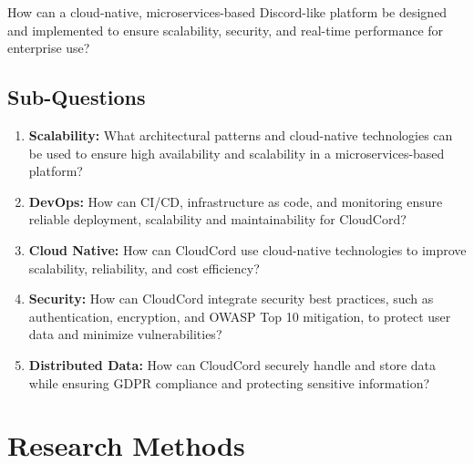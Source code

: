 \documentclass[12pt]{report}
\begin{document}
How can a cloud-native, microservices-based Discord-like platform be designed and implemented to ensure scalability, security, and real-time performance for enterprise use?

\section{Sub-Questions}

\begin{enumerate}

\item \textbf{Scalability:} What architectural patterns and cloud-native technologies can be used to ensure high availability and scalability in a microservices-based platform?

\item \textbf{DevOps:} How can CI/CD, infrastructure as code, and monitoring ensure reliable deployment, scalability and maintainability for CloudCord?

\item \textbf{Cloud Native:} How can CloudCord use cloud-native technologies to improve scalability, reliability, and cost efficiency?

\item \textbf{Security:} How can CloudCord integrate security best practices, such as authentication, encryption, and OWASP Top 10 mitigation, to protect user data and minimize vulnerabilities?

\item \textbf{Distributed Data:} How can CloudCord securely handle and store data while ensuring GDPR compliance and protecting sensitive information?
  
\end{enumerate}


\chapter{Research Methods}
\end{document}
